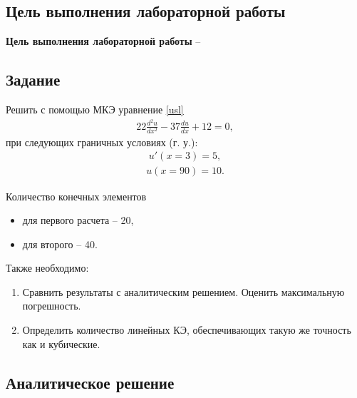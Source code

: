 \subsection{Цель выполнения лабораторной работы}\label{blockN.VariantM}
\textbf{Цель выполнения лабораторной работы }-- \GoalOfResearch

\subsection{Задание}

Решить с помощью МКЭ уравнение \ref{usl}
\begin{align}\label{usl}
22\frac{d^2u}{dx^2}  -37 \frac{du}{dx}       +12 
=0,
\end{align}
при следующих граничных условиях (г. у.): 
\begin{align}\label{2_rod}
    u'(x=3) = 5,
\end{align}
\begin{align}\label{1_rod}
    u(x=90) = 10.
\end{align}

Количество конечных элементов
\begin{itemize}
    \item для первого расчета -- 20,
    \item для второго -- 40.
\end{itemize}

Также необходимо:
\begin{enumerate}
    \item Сравнить результаты с аналитическим решением. Оценить максимальную погрешность.
    \item Определить количество линейных КЭ, обеспечивающих такую же точность как и кубические.
\end{enumerate}

\newpage
\subsection{Аналитическое решение}

